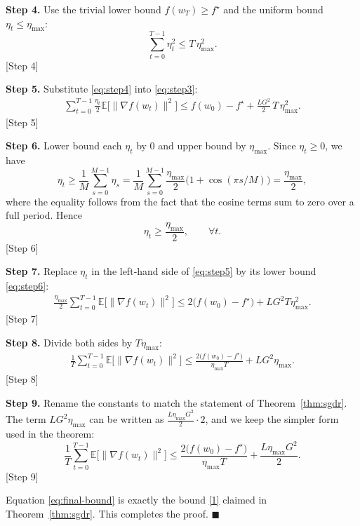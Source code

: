 \documentclass{article}
\newcommand{\E}{\mathbb{E}}
\begin{document}
\bigskip
\noindent\textbf{Step 4.} Use the trivial lower bound $f(w_T)\ge f^\star$ and the uniform bound $\eta_t\le\eta_{\max}$:
\[
\sum_{t=0}^{T-1}\eta_t^2 \le T\,\eta_{\max}^2 .
\tag{5}\label{eq:step4}
\]
[Step 4]

\bigskip
\noindent\textbf{Step 5.} Substitute \eqref{eq:step4} into \eqref{eq:step3}:
\begin{align}
\sum_{t=0}^{T-1}\frac{\eta_t}{2}\E\bigl[\|\nabla f(w_t)\|^2\bigr]
\le 
f(w_0)-f^\star + \frac{L G^2}{2}\,T\,\eta_{\max}^2 .
\tag{6}\label{eq:step5}
\end{align}
[Step 5]

\bigskip
\noindent\textbf{Step 6.} Lower bound each $\eta_t$ by $0$ and upper bound by $\eta_{\max}$. Since $\eta_t\ge 0$, we have
\[
\eta_t \ge \frac{1}{M}\sum_{s=0}^{M-1}\eta_s = \frac{1}{M}\sum_{s=0}^{M-1}
\frac{\eta_{\max}}{2}\bigl(1+\cos(\pi s/M)\bigr)
= \frac{\eta_{\max}}{2},
\]
where the equality follows from the fact that the cosine terms sum to zero over a full period. Hence
\[
\eta_t \ge \frac{\eta_{\max}}{2},\qquad \forall t.
\tag{7}\label{eq:step6}
\]
[Step 6]

\bigskip
\noindent\textbf{Step 7.} Replace $\eta_t$ in the left‑hand side of \eqref{eq:step5} by its lower bound \eqref{eq:step6}:
\begin{align}
\frac{\eta_{\max}}{2}\sum_{t=0}^{T-1}\E\bigl[\|\nabla f(w_t)\|^2\bigr]
\le 
2\bigl(f(w_0)-f^\star\bigr) + L G^2 T\eta_{\max}^2 .
\tag{8}\label{eq:step7}
\end{align}
[Step 7]

\bigskip
\noindent\textbf{Step 8.} Divide both sides by $T\eta_{\max}$:
\begin{align}
\frac{1}{T}\sum_{t=0}^{T-1}\E\bigl[\|\nabla f(w_t)\|^2\bigr]
\le 
\frac{2\bigl(f(w_0)-f^\star\bigr)}{\eta_{\max}T}
+ L G^2 \eta_{\max}.
\tag{9}\label{eq:step8}
\end{align}
[Step 8]

\bigskip
\noindent\textbf{Step 9.} Rename the constants to match the statement of Theorem~\ref{thm:sgdr}. The term $L G^2 \eta_{\max}$ can be written as $\frac{L\eta_{\max}G^2}{2}\cdot 2$, and we keep the simpler form used in the theorem:
\[
\frac{1}{T}\sum_{t=0}^{T-1}\E\bigl[\|\nabla f(w_t)\|^2\bigr]
\le 
\frac{2\bigl(f(w_0)-f^\star\bigr)}{\eta_{\max}T}
+ \frac{L\eta_{\max}G^2}{2}.
\tag{10}\label{eq:final-bound}
\]
[Step 9]

Equation \eqref{eq:final-bound} is exactly the bound \eqref{1} claimed in Theorem~\ref{thm:sgdr}. This completes the proof. \hfill $\blacksquare$
\end{document}
